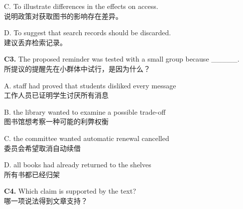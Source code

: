 \documentclass[a4paper,11pt,openany]{report}
\newcommand{\zhline}[1]{{\CJKsf\color{bodygrey}#1}}
\begin{document}
\begin{samepage}
C. To illustrate differences in the effects on access.\\
\zhline{说明政策对获取图书的影响存在差异。}
\par\end{samepage}

\begin{samepage}
D. To suggest that search records should be discarded.\\
\zhline{建议丢弃检索记录。}
\par\end{samepage}

\begin{samepage}
\textbf{C3.} The proposed reminder was tested with a small group because \_\_\_\_\_.\\
\zhline{所提议的提醒先在小群体中试行，是因为什么？}
\par\end{samepage}

\begin{samepage}
A. staff had proved that students disliked every message\\
\zhline{工作人员已证明学生讨厌所有消息}
\par\end{samepage}

\begin{samepage}
B. the library wanted to examine a possible trade-off\\
\zhline{图书馆想考察一种可能的利弊权衡}
\par\end{samepage}

\begin{samepage}
C. the committee wanted automatic renewal cancelled\\
\zhline{委员会希望取消自动续借}
\par\end{samepage}

\begin{samepage}
D. all books had already returned to the shelves\\
\zhline{所有书都已经归架}
\par\end{samepage}

\begin{samepage}
\textbf{C4.} Which claim is supported by the text?\\
\zhline{哪一项说法得到文章支持？}
\par\end{samepage}
\end{document}
